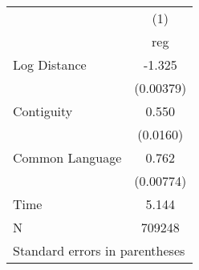 \begin{tabular}{l*{1}{c}}
\hline\hline
                &\multicolumn{1}{c}{(1)}\\
                &\multicolumn{1}{c}{reg}\\
\hline
Log Distance    &   -1.325\\
                &(0.00379)\\
[1em]
Contiguity      &    0.550\\
                & (0.0160)\\
[1em]
Common Language &    0.762\\
                &(0.00774)\\
\hline
Time            &    5.144\\
N               &   709248\\
\hline\hline
\multicolumn{2}{l}{\footnotesize Standard errors in parentheses}\\
\end{tabular}
